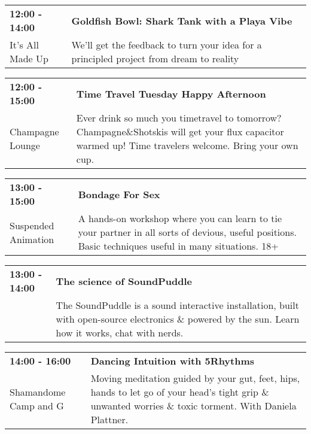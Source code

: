 \begin{tabular}{ p{1in} p{2.2in} }
    \textbf{12:00 - 14:00} & \textbf{Goldfish Bowl: Shark Tank with a Playa Vibe} \\
    It's All Made Up \newline  & We'll get the feedback to turn your idea for a principled project from dream to reality \\
    \hline 
\end{tabular}
    
\begin{tabular}{ p{1in} p{2.2in} }
    \textbf{12:00 - 15:00} & \textbf{Time Travel Tuesday Happy Afternoon} \\
    Champagne Lounge \newline  & Ever drink so much you timetravel to tomorrow? Champagne\&Shotskis will get your flux capacitor warmed up! Time travelers welcome. Bring your own cup. \\
    \hline 
\end{tabular}
    
\begin{tabular}{ p{1in} p{2.2in} }
    \textbf{13:00 - 15:00} & \textbf{Bondage For Sex} \\
    Suspended Animation \newline  & A hands-on workshop where you can learn to tie your partner in all sorts of devious, useful positions. Basic techniques useful in many situations. 18+ \\
    \hline 
\end{tabular}
    
\begin{tabular}{ p{1in} p{2.2in} }
    \textbf{13:00 - 14:00} & \textbf{The science of SoundPuddle} \\
    ~ \newline  & The SoundPuddle is a sound interactive installation, built with open-source electronics \& powered by the sun. Learn how it works, chat with nerds. \\
    \hline 
\end{tabular}
    
\begin{tabular}{ p{1in} p{2.2in} }
    \textbf{14:00 - 16:00} & \textbf{Dancing Intuition with 5Rhythms} \\
    Shamandome Camp \newline 630 and G & Moving meditation guided by your gut, feet, hips, hands to let go of your head's tight grip \& unwanted worries \& toxic torment. With Daniela Plattner. \\
    \hline 
\end{tabular}
    
